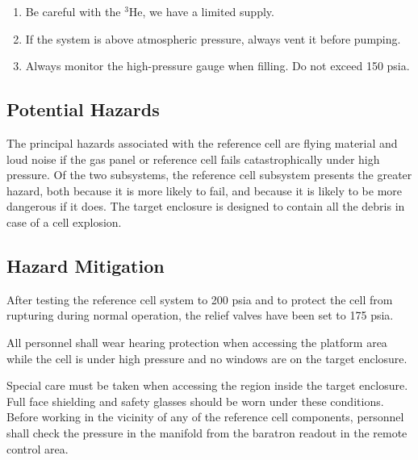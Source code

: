 {\begin{enumerate}

\item Be careful with the $^3$He, we have a limited supply.

\item If the system is above atmospheric pressure, always vent it
before pumping.  

\item Always monitor the high-pressure gauge when filling. Do not  exceed 150 psia.

\end{enumerate}

\begin{safetyen}{10}{5}

\subsection{Potential Hazards}

The principal hazards associated with the reference cell are
flying material and loud noise if the gas panel or reference cell
fails catastrophically under high pressure.  Of the two subsystems,
the reference cell subsystem presents the greater hazard, both because
it is more likely to fail, and because it is likely to be more
dangerous if it does.  The target enclosure is designed to contain all the 
debris in case of a cell explosion.


\subsection{Hazard Mitigation }

After testing the reference cell system to 200 psia and to protect the
cell from rupturing during normal operation, the relief valves have
been set to 175 psia.


All personnel shall wear hearing protection when accessing the
 platform area while the cell is under high pressure and no windows
 are on the target enclosure.

Special care must be taken when accessing the region inside the target
enclosure.  Full face shielding and safety glasses should be worn
under these conditions.  Before working in the vicinity of any of the
reference cell components, personnel shall check the pressure in the
manifold from the baratron readout in the remote control area.

\end{safetyen}

} %
